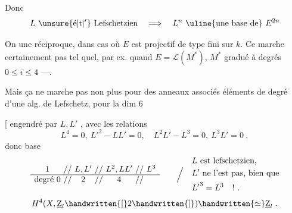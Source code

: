 Donc
\[
L\ \unsure{\text{é}|\text{t}|{}^{\prime}}\ \text{Lefschetzien}\quad\Longrightarrow\quad L^n\ \text{\uline{une base de}}\ E^{2n}
\]

 On   une réciproque, dans   cas où  $E$ est projectif de type fini sur $k$. Ce  marche certainement pas tel quel, par ex. quand $E=\mathcal L(M^*)$, $M^*$ gradué à degrés $0\leq i\leq4$ ---.

Mais ça ne marche pas non plus pour des anneaux associés  éléments de degré  d'une alg. de Lefschetz, pour la dim 6

[ engendré par $L,L'$ , avec les relations
\[
L^4=0,\ {L'}^{2}-LL'=0,\quad L^2L'-L^3=0,\ L^3L'=0\ ,
\]
donc base
\[
\begin{array}{c@{\ //\ }c@{\ //\ }c@{\ //\ }c}
1&L,L'&L^2,LL'&L^3\\ \hline
\text{degré }0&2&4&
\end{array}
\qquad\Big/\quad
\begin{aligned}
&L\ \text{est lefschetzien,}\\
&L'\ \text{ne l'est pas, bien que}\\
&{L'}^{3}=L^3\quad !\ .
\end{aligned}
\]
\[
H^4(X,\underline{\mathrm Z}_l\handwritten{[}2\handwritten{]})\handwritten{\simeq}\underline{\mathrm Z}_l\ .
\]
